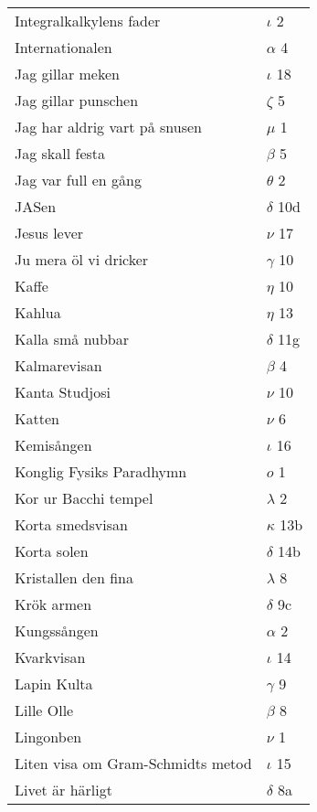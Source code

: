 \documentclass[a6paper,10pt]{article}
\begin{document}
\newpage
\setlength{\oddsidemargin}{-0.47in}
\begin{table}[!h]
\begin{tabular}{l l}
Integralkalkylens fader&$\iota$ 2\\
Internationalen&$\alpha$ 4\\
Jag gillar meken&$\iota$ 18\\
Jag gillar punschen&$\zeta$ 5\\
Jag har aldrig vart på snusen&$\mu$ 1\\
Jag skall festa&$\beta$ 5\\
Jag var full en gång&$\theta$ 2\\
JASen&$\delta$ 10d\\
Jesus lever&$\nu$ 17\\
Ju mera öl vi dricker&$\gamma$ 10\\
Kaffe&$\eta$ 10\\
Kahlua&$\eta$ 13\\
Kalla små nubbar&$\delta$ 11g\\
Kalmarevisan&$\beta$ 4\\
Kanta Studjosi&$\nu$ 10\\
Katten&$\nu$ 6\\
Kemisången&$\iota$ 16\\
Konglig Fysiks Paradhymn&$o$ 1\\
Kor ur Bacchi tempel	&$\lambda$ 2\\
Korta smedsvisan&	$\kappa$ 13b\\
Korta solen	&$\delta$ 14b\\
Kristallen den fina&	$\lambda$ 8\\
Krök armen	&$\delta$ 9c\\
Kungssången&	$\alpha$ 2\\
Kvarkvisan	&$\iota$ 14\\
Lapin Kulta&$\gamma$ 9\\
Lille Olle	&$\beta$ 8\\
Lingonben	&$\nu$ 1\\
Liten visa om Gram-Schmidts metod	&$\iota$ 15\\
Livet är härligt&	$\delta$ 8a\\
\end{tabular}
\end{table}
\end{document}
